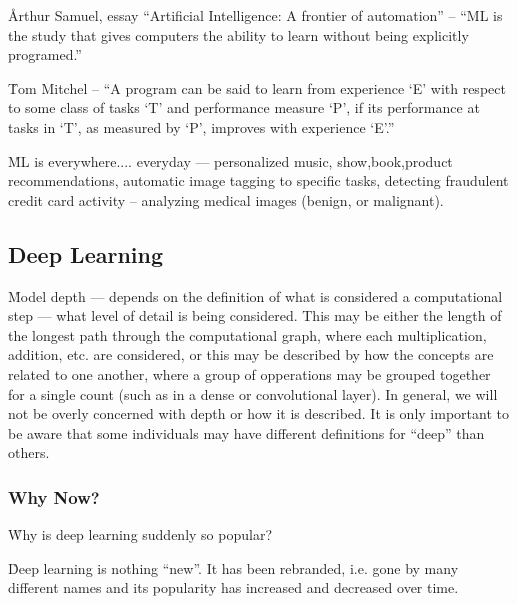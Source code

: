 \r{Arthur Samuel, essay ``Artificial Intelligence: A frontier of automation'' \cite{samuel1962artificial} -- ``ML is the study that gives computers the ability to learn without being explicitly programed.'' }

\r{Tom Mitchel -- ``A program can be said to learn from experience `E' with respect to some class of tasks `T' and performance measure `P', if its performance at tasks in `T', as measured by `P', improves with experience `E'.''}

\r{ML is everywhere.... everyday --- personalized music, show,book,product recommendations, automatic image tagging to specific tasks, detecting fraudulent credit card activity -- analyzing medical images (benign, or malignant). }




\subsection{Deep Learning}

\r{Model depth --- depends on the definition of what is considered a computational step --- what level of detail is being considered. This may be either the length of the longest path through the computational graph, where each multiplication, addition, etc. are considered, or this may be described by how the concepts are related to one another, where a group of opperations may be grouped together for a single count (such as in a dense or convolutional layer). In general, we will not be overly concerned with depth or how it is described. It is only important to be aware that some individuals may have different definitions for ``deep'' than others.}

\subsubsection{Why Now?}

\r{Why is deep learning suddenly so popular?}

\r{Deep learning is nothing ``new''. It has been rebranded, i.e. gone by many different names  and its popularity has increased and decreased over time.}

